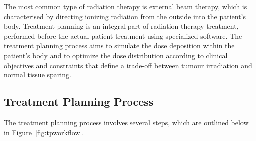 The most common type of radiation therapy is external beam therapy, which is characterised
by directing ionizing radiation from the outside into the patient's body. Treatment planning is an
integral part of radiation therapy treatment, performed before the actual patient treatment using specialized software. The treatment planning process aims to simulate the dose deposition within the patient's body and to optimize the dose distribution according to clinical objectives and constraints that define a trade-off between tumour irradiation and normal tissue sparing. 
\subsection{Treatment Planning Process}
The treatment planning process involves several steps, which are outlined below in Figure~\ref{fig:tpworkflow}.

